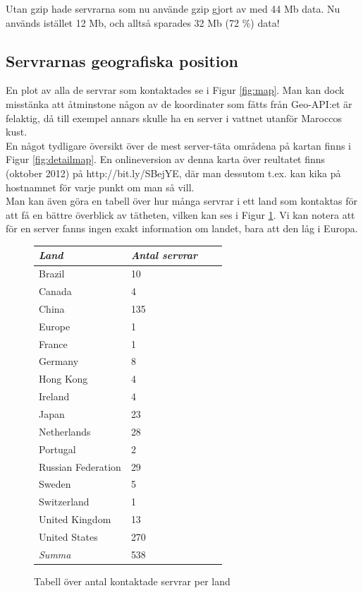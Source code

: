 \documentclass[a4paper]{article}
\begin{document}
Utan gzip hade servrarna som nu använde gzip gjort av med 44 Mb data. Nu används istället 12 Mb, och alltså sparades 32 Mb (72 \%) data!

\subsection{Servrarnas geografiska position}
En plot av alla de servrar som kontaktades se i Figur \ref{fig:map}. Man kan dock misstänka att åtminstone någon av de koordinater som fåtts från Geo-API:et är felaktig, då till exempel annars skulle ha en server i vattnet utanför Maroccos kust.\\

En något tydligare översikt över de mest server-täta områdena på kartan finns i Figur \ref{fig:detailmap}. En onlineversion av denna karta över reultatet finns (oktober 2012) på http://bit.ly/SBejYE, där man dessutom t.ex. kan kika på hostnamnet för varje punkt om man så vill.\\

Man kan även göra en tabell över hur många servrar i ett land som kontaktas för att få en bättre överblick av tätheten, vilken kan ses i Figur \ref{tab:countries}. Vi kan notera att för en server fanns ingen exakt information om landet, bara att den låg i Europa.

\begin{figure}
    \centering
    \begin{tabular}{ | l | l | l | p{5cm} |}
    \hline
    \emph{Land} & \emph{Antal servrar} \\ \hline
        Brazil  &   10 \\ \hline
        Canada  &   4 \\ \hline
        China   &   135 \\ \hline
        Europe  &   1 \\ \hline
        France  &   1 \\ \hline
        Germany &   8 \\ \hline
        Hong Kong   &   4 \\ \hline
        Ireland &   4 \\ \hline
        Japan   &   23 \\ \hline
        Netherlands &   28 \\ \hline
        Portugal    &   2 \\ \hline
        Russian Federation  &   29 \\ \hline
        Sweden  &   5 \\ \hline
        Switzerland &   1 \\ \hline
        United Kingdom  &   13 \\ \hline
        United States   &   270 \\ \hline
        \hline
        \emph{Summa} & 538 \\ \hline
    \end{tabular}
    \caption{Tabell över antal kontaktade servrar per land}
    \label{tab:countries}
\end{figure}
\end{document}
